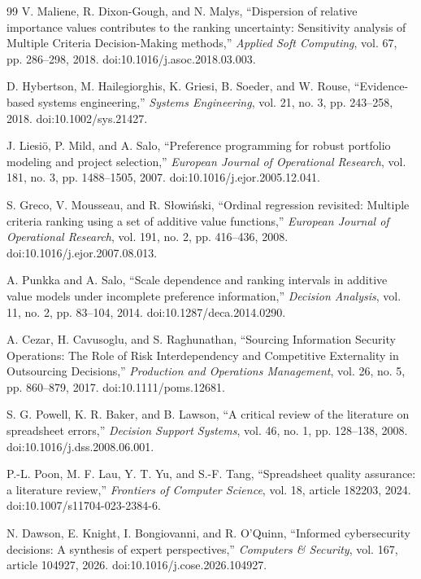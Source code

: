\documentclass[systems,article,submit,moreauthors]{Definitions/mdpi}
\begin{document}
\begin{thebibliography}{99}
 V. Maliene, R. Dixon-Gough, and N. Malys, ``Dispersion of relative importance values contributes to the ranking uncertainty: Sensitivity analysis of Multiple Criteria Decision-Making methods,'' \emph{Applied Soft Computing}, vol. 67, pp. 286--298, 2018. doi:10.1016/j.asoc.2018.03.003.

 D. Hybertson, M. Hailegiorghis, K. Griesi, B. Soeder, and W. Rouse, ``Evidence-based systems engineering,'' \emph{Systems Engineering}, vol. 21, no. 3, pp. 243--258, 2018. doi:10.1002/sys.21427.

 J. Liesi\"o, P. Mild, and A. Salo, ``Preference programming for robust portfolio modeling and project selection,'' \emph{European Journal of Operational Research}, vol. 181, no. 3, pp. 1488--1505, 2007. doi:10.1016/j.ejor.2005.12.041.

 S. Greco, V. Mousseau, and R. S\l{}owi\'nski, ``Ordinal regression revisited: Multiple criteria ranking using a set of additive value functions,'' \emph{European Journal of Operational Research}, vol. 191, no. 2, pp. 416--436, 2008. doi:10.1016/j.ejor.2007.08.013.

 A. Punkka and A. Salo, ``Scale dependence and ranking intervals in additive value models under incomplete preference information,'' \emph{Decision Analysis}, vol. 11, no. 2, pp. 83--104, 2014. doi:10.1287/deca.2014.0290.

 A. Cezar, H. Cavusoglu, and S. Raghunathan, ``Sourcing Information Security Operations: The Role of Risk Interdependency and Competitive Externality in Outsourcing Decisions,'' \emph{Production and Operations Management}, vol. 26, no. 5, pp. 860--879, 2017. doi:10.1111/poms.12681.

 S. G. Powell, K. R. Baker, and B. Lawson, ``A critical review of the literature on spreadsheet errors,'' \emph{Decision Support Systems}, vol. 46, no. 1, pp. 128--138, 2008. doi:10.1016/j.dss.2008.06.001.

 P.-L. Poon, M. F. Lau, Y. T. Yu, and S.-F. Tang, ``Spreadsheet quality assurance: a literature review,'' \emph{Frontiers of Computer Science}, vol. 18, article 182203, 2024. doi:10.1007/s11704-023-2384-6.

 N. Dawson, E. Knight, I. Bongiovanni, and R. O'Quinn, ``Informed cybersecurity decisions: A synthesis of expert perspectives,'' \emph{Computers \& Security}, vol. 167, article 104927, 2026. doi:10.1016/j.cose.2026.104927.


\end{thebibliography}
\end{document}
